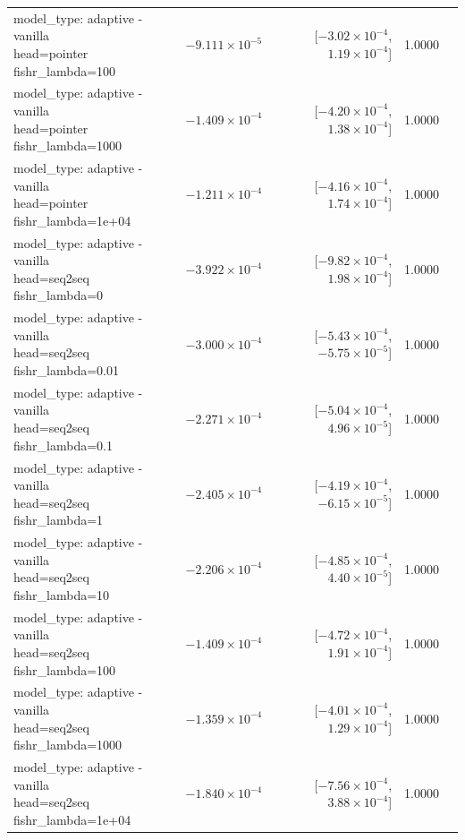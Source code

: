 \documentclass[10pt]{article}
\makeatletter
\newcommand{\stackcell}[1]{\begin{tabular}[t]{@{}l@{}}#1\end{tabular}}
\makeatother
\begin{document}
{\begin{longtable}{lrrrl}
\stackcell{model\_type: adaptive - vanilla\\\footnotesize head=pointer fishr\_lambda=100 } & $-9.111\times10^{-5}$ & [$-3.02\times10^{-4}$, $1.19\times10^{-4}$] & 1.0000 & \\
\stackcell{model\_type: adaptive - vanilla\\\footnotesize head=pointer fishr\_lambda=1000 } & $-1.409\times10^{-4}$ & [$-4.20\times10^{-4}$, $1.38\times10^{-4}$] & 1.0000 & \\
\stackcell{model\_type: adaptive - vanilla\\\footnotesize head=pointer fishr\_lambda=1e+04 } & $-1.211\times10^{-4}$ & [$-4.16\times10^{-4}$, $1.74\times10^{-4}$] & 1.0000 & \\
\stackcell{model\_type: adaptive - vanilla\\\footnotesize head=seq2seq fishr\_lambda=0 } & $-3.922\times10^{-4}$ & [$-9.82\times10^{-4}$, $1.98\times10^{-4}$] & 1.0000 & \\
\stackcell{model\_type: adaptive - vanilla\\\footnotesize head=seq2seq fishr\_lambda=0.01 } & $-3.000\times10^{-4}$ & [$-5.43\times10^{-4}$, $-5.75\times10^{-5}$] & 1.0000 & \\
\stackcell{model\_type: adaptive - vanilla\\\footnotesize head=seq2seq fishr\_lambda=0.1 } & $-2.271\times10^{-4}$ & [$-5.04\times10^{-4}$, $4.96\times10^{-5}$] & 1.0000 & \\
\stackcell{model\_type: adaptive - vanilla\\\footnotesize head=seq2seq fishr\_lambda=1 } & $-2.405\times10^{-4}$ & [$-4.19\times10^{-4}$, $-6.15\times10^{-5}$] & 1.0000 & \\
\stackcell{model\_type: adaptive - vanilla\\\footnotesize head=seq2seq fishr\_lambda=10 } & $-2.206\times10^{-4}$ & [$-4.85\times10^{-4}$, $4.40\times10^{-5}$] & 1.0000 & \\
\stackcell{model\_type: adaptive - vanilla\\\footnotesize head=seq2seq fishr\_lambda=100 } & $-1.409\times10^{-4}$ & [$-4.72\times10^{-4}$, $1.91\times10^{-4}$] & 1.0000 & \\
\stackcell{model\_type: adaptive - vanilla\\\footnotesize head=seq2seq fishr\_lambda=1000 } & $-1.359\times10^{-4}$ & [$-4.01\times10^{-4}$, $1.29\times10^{-4}$] & 1.0000 & \\
\stackcell{model\_type: adaptive - vanilla\\\footnotesize head=seq2seq fishr\_lambda=1e+04 } & $-1.840\times10^{-4}$ & [$-7.56\times10^{-4}$, $3.88\times10^{-4}$] & 1.0000 & \\

\end{longtable}}
\end{document}
